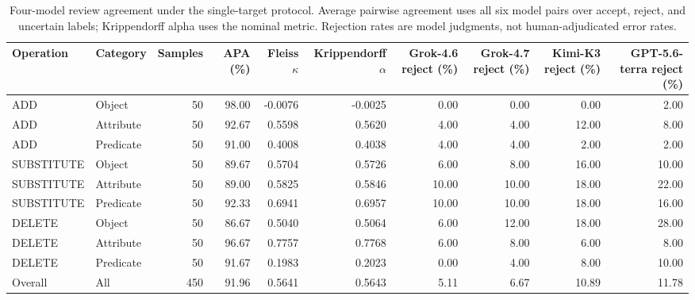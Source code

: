 \begin{table}[t]
\centering
\small
\caption{Four-model review agreement under the single-target protocol. Average pairwise agreement uses all six model pairs over accept, reject, and uncertain labels; Krippendorff alpha uses the nominal metric. Rejection rates are model judgments, not human-adjudicated error rates.}
\label{tab:model-review-agreement}
\begin{tabular}{llrrrrrrrr}
\hline
Operation & Category & Samples & APA (\%) & Fleiss $\kappa$ & Krippendorff $\alpha$ & Grok-4.6 reject (\%) & Grok-4.7 reject (\%) & Kimi-K3 reject (\%) & GPT-5.6-terra reject (\%) \\
\hline
ADD & Object & 50 & 98.00 & -0.0076 & -0.0025 & 0.00 & 0.00 & 0.00 & 2.00 \\
ADD & Attribute & 50 & 92.67 & 0.5598 & 0.5620 & 4.00 & 4.00 & 12.00 & 8.00 \\
ADD & Predicate & 50 & 91.00 & 0.4008 & 0.4038 & 4.00 & 4.00 & 2.00 & 2.00 \\
SUBSTITUTE & Object & 50 & 89.67 & 0.5704 & 0.5726 & 6.00 & 8.00 & 16.00 & 10.00 \\
SUBSTITUTE & Attribute & 50 & 89.00 & 0.5825 & 0.5846 & 10.00 & 10.00 & 18.00 & 22.00 \\
SUBSTITUTE & Predicate & 50 & 92.33 & 0.6941 & 0.6957 & 10.00 & 10.00 & 18.00 & 16.00 \\
DELETE & Object & 50 & 86.67 & 0.5040 & 0.5064 & 6.00 & 12.00 & 18.00 & 28.00 \\
DELETE & Attribute & 50 & 96.67 & 0.7757 & 0.7768 & 6.00 & 8.00 & 6.00 & 8.00 \\
DELETE & Predicate & 50 & 91.67 & 0.1983 & 0.2023 & 0.00 & 4.00 & 8.00 & 10.00 \\
Overall & All & 450 & 91.96 & 0.5641 & 0.5643 & 5.11 & 6.67 & 10.89 & 11.78 \\
\hline
\end{tabular}
\end{table}

